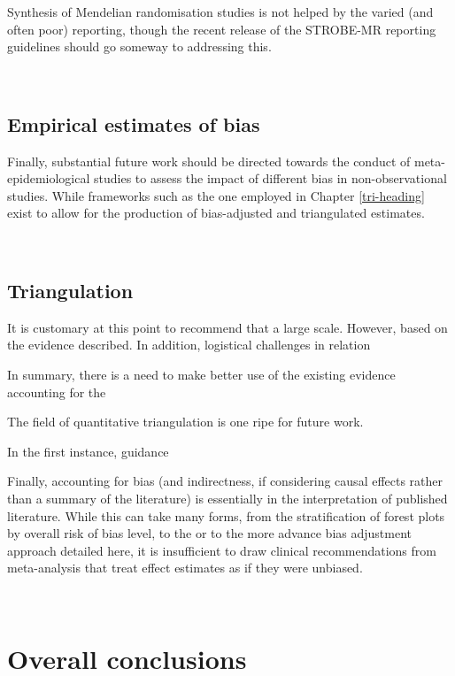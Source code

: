 \documentclass[a4paper, twoside]{templates/ociamthesis}
\begin{document}
Synthesis of Mendelian randomisation studies is not helped by the varied (and often poor) reporting, though the recent release of the STROBE-MR reporting guidelines should go someway to addressing this.

~

\hypertarget{empirical-estimates-of-bias}{%
\subsection{Empirical estimates of bias}\label{empirical-estimates-of-bias}}

Finally, substantial future work should be directed towards the conduct of meta-epidemiological studies to assess the impact of different bias in non-observational studies. While frameworks such as the one employed in Chapter \ref{tri-heading} exist to allow for the production of bias-adjusted and triangulated estimates.

~

\hypertarget{triangulation}{%
\subsection{Triangulation}\label{triangulation}}

It is customary at this point to recommend that a large scale. However, based on the evidence described. In addition, logistical challenges in relation

In summary, there is a need to make better use of the existing evidence accounting for the

The field of quantitative triangulation is one ripe for future work.

In the first instance, guidance

Finally, accounting for bias (and indirectness, if considering causal effects rather than a summary of the literature) is essentially in the interpretation of published literature. While this can take many forms, from the stratification of forest plots by overall risk of bias level, to the or to the more advance bias adjustment approach detailed here, it is insufficient to draw clinical recommendations from meta-analysis that treat effect estimates as if they were unbiased.

~

\hypertarget{overall-conclusions}{%
\section{Overall conclusions}\label{overall-conclusions}}
\end{document}
